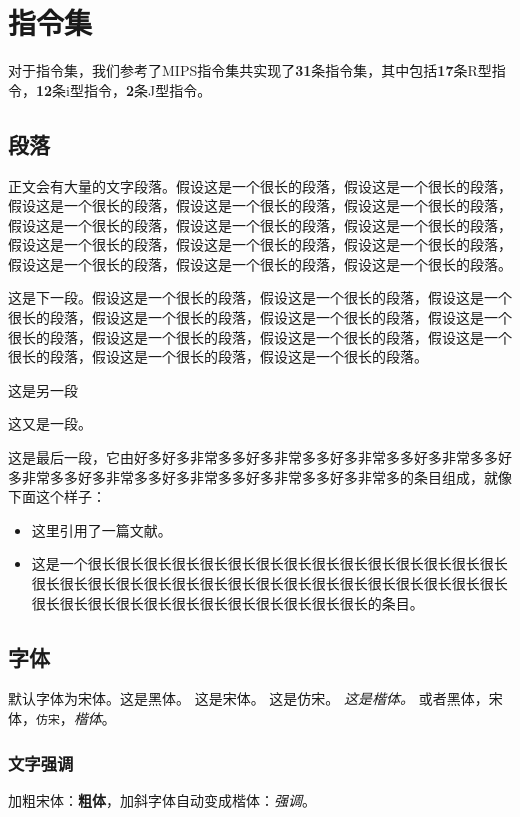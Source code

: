 \documentclass[12pt]{article} %
\begin{document}
\section{指令集}
对于指令集，我们参考了MIPS指令集共实现了\textbf{31}条指令集，其中包括\textbf{17}条R型指令，\textbf{12}条i型指令，\textbf{2}条J型指令。%

\subsection{段落}
正文会有大量的文字段落。假设这是一个很长的段落，假设这是一个很长的段落，假设这是一个很长的段落，假设这是一个很长的段落，假设这是一个很长的段落，假设这是一个很长的段落，假设这是一个很长的段落，假设这是一个很长的段落，假设这是一个很长的段落，假设这是一个很长的段落，假设这是一个很长的段落，假设这是一个很长的段落，假设这是一个很长的段落，假设这是一个很长的段落。

这是下一段。假设这是一个很长的段落，假设这是一个很长的段落，假设这是一个很长的段落，假设这是一个很长的段落，假设这是一个很长的段落，假设这是一个很长的段落，假设这是一个很长的段落，假设这是一个很长的段落，假设这是一个很长的段落，假设这是一个很长的段落，假设这是一个很长的段落。

这是另一段

这又是一段。

这是最后一段，它由好多好多非常多多好多非常多多好多非常多多好多非常多多好多非常多多好多非常多多好多非常多多好多非常多多好多非常多的条目组成，就像下面这个样子：

\begin{itemize}
  \item 这里引用了一篇文献\cite{cao17}。
  \item 这是一个很长很长很长很长很长很长很长很长很长很长很长很长很长很长很长很长很长很长很长很长很长很长很长很长很长很长很长很长很长很长很长很长很长很长很长很长很长很长很长很长很长很长很长很长的条目。
\end{itemize}

\subsection{字体}
默认字体为宋体。{\sffamily 这是黑体。} {\rmfamily 这是宋体。} {\ttfamily 这是仿宋。} {\it 这是楷体。}
或者\textsf{黑体}，\textrm{宋体}，\texttt{仿宋}，\textit{楷体}。

\subsubsection{文字强调}
加粗宋体：\textbf{粗体}，加斜字体自动变成楷体：\textit{强调}。
\end{document}
